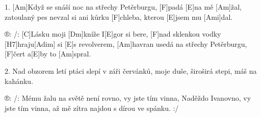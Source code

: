 
1. [Am]Když se snáší noc na střechy Petěrburgu, [F]padá [E]na mě [Am]\null žal,
zatoulaný pes nevzal si ani kůrku [F]chleba, kterou [E]jsem mu [Ami]dal.

®: /: [C]Lásku moji [Dm]kníže I[E]gor si bere,
[F]nad sklenkou vodky [H7]hraju[Adim] si [E]s revolverem,
[Am]havran usedá na střechy Petěrburgu, [F]\null čert a[E]by to [Am]spral.

2. Nad obzorem letí ptáci slepí v záři červánků,
moje duše, široširá stepi, máš na kahánku.

®: /: Mému žalu na světě není rovno,
vy jste tím vinna, Naděždo Ivanovno,
vy jste tím vinna, až mě zítra najdou s dírou ve spánku. :/



